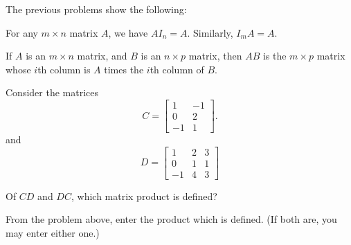 
The previous problems show the following:

{}  
For any $m\times n$ matrix $A$, we have $AI_n = A$.  Similarly, $I_m A = A$.  

\endedxtext






\endedxvertical






{}  
If $A$ is an $m\times n$ matrix, and $B$ is an $n\times p$ matrix, then $AB$ is the $m\times p$ matrix
whose $i$th column is $A$ times the $i$th column of $B$.  

\endedxtext




Consider the matrices
\[ C = \left[\begin{array}{cc} 1 & -1 \\ 0 & 2  \\ -1 & 1  \end{array} \right]. \]
and 
\[ D = \left[\begin{array}{ccc} 1 & 2 & 3 \\ 0 & 1 & 1 \\ -1 & 4 & 3  \end{array} \right] \]

Of $CD$ and $DC$, which matrix product is defined?  




\endedxproblem




From the problem above, enter the product which is defined.  (If both are, you may enter either one.)  

 


